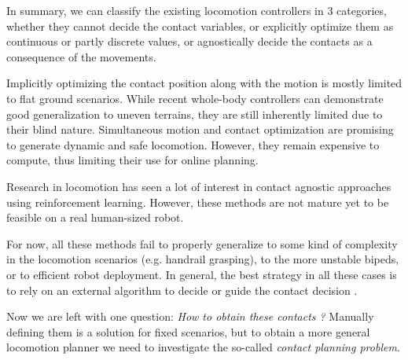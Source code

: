 
In summary, we can classify the existing locomotion controllers in 3 categories, whether they cannot decide the contact variables, or explicitly optimize them as continuous or partly discrete values, or agnostically decide the contacts as a consequence of the movements.

Implicitly optimizing the contact position along with the motion is mostly limited to flat ground scenarios.
While recent whole-body controllers can demonstrate good generalization to uneven terrains, they are still inherently limited due to their blind nature.
Simultaneous motion and contact optimization are promising to generate dynamic and safe locomotion. 
However, they remain expensive to compute, thus limiting their use for online planning.

Research in locomotion has seen a lot of interest in contact agnostic approaches using reinforcement learning.
However, these methods are not mature yet to be feasible on a real human-sized robot.



For now, all these methods fail to properly generalize to some kind of complexity in the locomotion scenarios (e.g. handrail grasping), to the more unstable bipeds, or to efficient robot deployment.
In general, the best strategy in all these cases is to rely on an external algorithm to decide or guide the contact decision \cite{carpentier2016_versatile_efficient, pierre_alexandre_2021, ewen_2022}.

Now we are left with one question: \textit{How to obtain these contacts ?}
Manually defining them is a solution for fixed scenarios, but to obtain a more general locomotion planner we need to investigate the so-called \textit{contact planning problem}.


